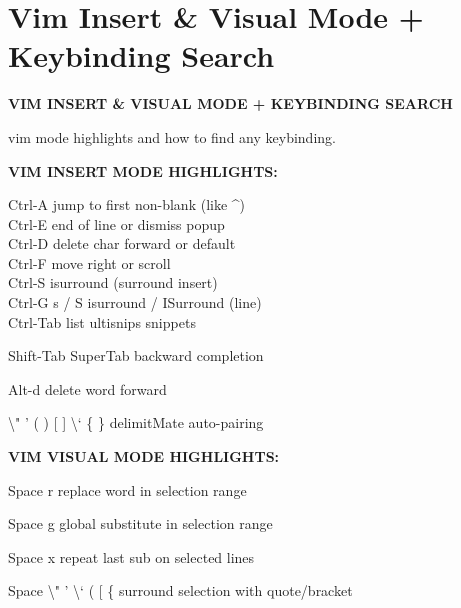 \documentclass[11pt,a4paper,twoside]{book}
\begin{document}
\vspace{16pt}

\section{Vim Insert \& Visual Mode + Keybinding Search}


\vspace{10pt}
{\large\bfseries\color{neoncyan} VIM INSERT \& VISUAL MODE + KEYBINDING SEARCH}\vspace{6pt}

vim mode highlights and how to find any keybinding.


\vspace{12pt}
{\bfseries\color{neonyellow} VIM INSERT MODE HIGHLIGHTS:}\vspace{4pt}

\begin{codebox}
Ctrl-A                jump to first non-blank (like \textasciicircum{})\\
Ctrl-E                end of line or dismiss popup\\
Ctrl-D                delete char forward or default\\
Ctrl-F                move right or scroll\\
Ctrl-S                isurround (surround insert)\\
Ctrl-G s / S          isurround / ISurround (line)\\
Ctrl-Tab              list ultisnips snippets\\
\end{codebox}

Shift-Tab             SuperTab backward completion

Alt-d                 delete word forward

\textbackslash{}" ' ( ) [ ] \textbackslash{}` \{ \}    delimitMate auto-pairing


\vspace{12pt}
{\bfseries\color{neonyellow} VIM VISUAL MODE HIGHLIGHTS:}\vspace{4pt}

Space r               replace word in selection range

Space g               global substitute in selection range

Space x               repeat last sub on selected lines

Space \textbackslash{}" ' \textbackslash{}` ( [ \{    surround selection with quote/bracket
\end{document}

